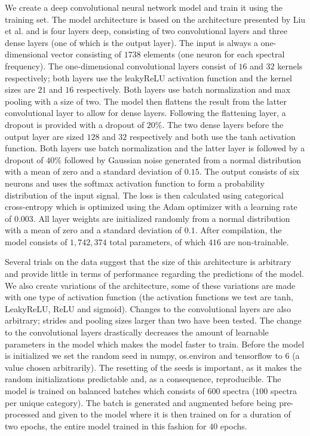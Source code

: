 We create a deep convolutional neural network model and train it using the training set. The model architecture is based on the architecture presented by Liu et al. \cite{liu2017deep} and is four layers deep, consisting of two convolutional layers and three dense layers (one of which is the output layer). The input is always a one-dimensional vector consisting of $1738$ elements (one neuron for each spectral frequency). The one-dimensional convolutional layers consist of $16$ and $32$ kernels respectively; both layers use the leakyReLU activation function and the kernel sizes are $21$ and $16$ respectively. Both layers use batch normalization and max pooling with a size of two. The model then flattens the result from the latter convolutional layer to allow for dense layers. Following the flattening layer, a dropout is provided with a dropout of $20\%$. The two dense layers before the output layer are sized $128$ and $32$ respectively and both use the tanh activation function. Both layers use batch normalization and the latter layer is followed by a dropout of $40\%$ followed by Gaussian noise generated from a normal distribution with a mean of zero and a standard deviation of $0.15$. The output consists of six neurons and uses the softmax activation function to form a probability distribution of the input signal. The loss is then calculated using categorical cross-entropy which is optimized using the Adam optimizer with a learning rate of $0.003$. All layer weights are initialized randomly from a normal distribution with a mean of zero and a standard deviation of $0.1$. After compilation, the model consists of $1,742,374$ total parameters, of which $416$ are non-trainable.

Several trials on the data suggest that the size of this architecture is arbitrary and provide little in terms of performance regarding the predictions of the model. We also create variations of the architecture, some of these variations are made with one type of activation function (the activation functions we test are tanh, LeakyReLU, ReLU and sigmoid). Changes to the convolutional layers are also arbitrary; strides and pooling sizes larger than two have been tested. The change to the convolutional layers drastically decreases the amount of learnable parameters in the model which makes the model faster to train. Before the model is initialized we set the random seed in numpy, os.environ and tensorflow to 6 (a value chosen arbitrarily). The resetting of the seeds is important, as it makes the random initializations predictable and, as a consequence, reproducible. The model is trained on balanced batches which consists of $600$ spectra ($100$ spectra per unique category). The batch is generated and augmented before being pre-processed and given to the model where it is then trained on for a duration of two epochs, the entire model trained in this fashion for $40$ epochs.

